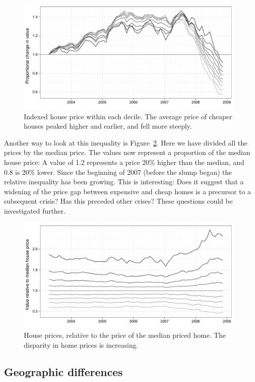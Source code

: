 \documentclass[oneside]{article}
\begin{document}
\begin{figure}[htbp]
  \centering
  \includegraphics[width=0.75\linewidth]{decile-ind}
  \caption{Indexed house price within each decile.  The average price of cheaper houses peaked higher and earlier, and fell more steeply.}
  \label{fig:decile-ind}
\end{figure}

Another way to look at this inequality is Figure~\ref{fig:decile-rel}.  Here we have divided all the prices by the median price.  The values now represent a proportion of the median house price: A value of 1.2 represents a price 20\% higher than the median, and 0.8 is 20\% lower. Since the beginning of 2007 (before the slump began) the relative inequality has been growing.  This is interesting: Does it suggest that a widening of the price gap between expensive and cheap homes is a precursor to a subsequent crisis? Has this preceded other crises? These questions could be investigated further.

\begin{figure}[htbp]
  \centering
  \includegraphics[width=0.75\linewidth]{decile-rel}
  \caption{House prices, relative to the price of the median priced home.  The disparity in home prices is increasing.}
  \label{fig:decile-rel}
\end{figure}

\subsection{Geographic differences}
\end{document}
